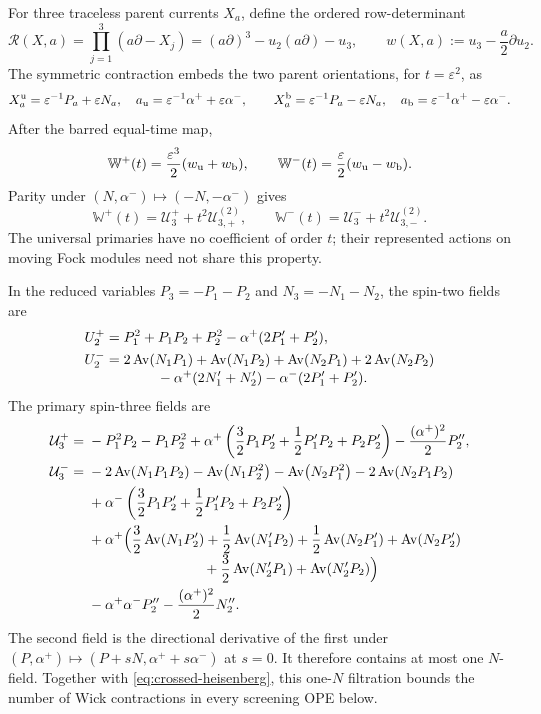 \documentclass[11pt,a4paper]{article}
\numberwithin{equation}{section}
\theoremstyle{remark}
\newcommand{\Av}[1]{\operatorname{Av}\!\left(#1\right)}
\newcommand{\cU}{\mathcal U}
\newcommand{\eps}{\varepsilon}
\begin{document}
For three traceless parent currents $X_a$, define the ordered row-determinant
\begin{equation}
 \mathcal R(X,a)=\prod_{j=1}^3(a\partial-X_j)
 =(a\partial)^3-u_2(a\partial)-u_3,
 \qquad
 w(X,a):=u_3-\frac a2\partial u_2.
 \label{eq:parent-miura}
\end{equation}
The symmetric contraction embeds the two parent orientations, for $t=\eps^2$, as
\begin{equation}
 X_a^{\rm u}=\eps^{-1}P_a+\eps N_a,\quad
 a_{\rm u}=\eps^{-1}\alpha^++\eps\alpha^-,
 \qquad
 X_a^{\rm b}=\eps^{-1}P_a-\eps N_a,\quad
 a_{\rm b}=\eps^{-1}\alpha^+-\eps\alpha^-.
 \label{eq:parent-embeddings}
\end{equation}
After the barred equal-time map,
\begin{equation}
 \mathbb W^+(t)=\frac{\eps^3}{2}(w_{\rm u}+w_{\rm b}),\qquad
 \mathbb W^-(t)=\frac{\eps}{2}(w_{\rm u}-w_{\rm b}).
 \label{eq:contracted-primary-families}
\end{equation}
Parity under $(N,\alpha^-)\mapsto(-N,-\alpha^-)$ gives
\begin{equation}
 \mathbb W^+(t)=\cU_3^++t^2\cU_{3,+}^{(2)},\qquad
 \mathbb W^-(t)=\cU_3^-+t^2\cU_{3,-}^{(2)}.
 \label{eq:no-universal-linear-term}
\end{equation}
The universal primaries have no coefficient of order $t$; their represented actions on moving
Fock modules need not share this property.

In the reduced variables $P_3=-P_1-P_2$ and $N_3=-N_1-N_2$, the spin-two fields are
\begin{align}
 U_2^+&=P_1^2+P_1P_2+P_2^2-\alpha^+(2P_1'+P_2'),
 \label{eq:U2plus}\\
 U_2^-&=2\Av{N_1P_1}+\Av{N_1P_2}+\Av{N_2P_1}+2\Av{N_2P_2}
 \nonumber\\[-1mm]
 &\hspace{13mm}-\alpha^+(2N_1'+N_2')-\alpha^-(2P_1'+P_2').
 \label{eq:U2minus}
\end{align}
The primary spin-three fields are
\begin{align}
 \cU_3^+={}&-P_1^2P_2-P_1P_2^2
 +\alpha^+\left(\frac32P_1P_2'+\frac12P_1'P_2+P_2P_2'\right)
 -\frac{(\alpha^+)^2}{2}P_2'',
 \label{eq:U3plus}\\
 \cU_3^-={}&-2\Av{N_1P_1P_2}-\Av{N_1P_2^2}-\Av{N_2P_1^2}
 -2\Av{N_2P_1P_2}
 \nonumber\\
 &+\alpha^-\left(\frac32P_1P_2'+\frac12P_1'P_2+P_2P_2'\right)
 \nonumber\\
 &+\alpha^+\Bigl(\frac32\Av{N_1P_2'}+\frac12\Av{N_1'P_2}
 +\frac12\Av{N_2P_1'}+\Av{N_2P_2'}
 \nonumber\\[-1mm]
 &\hspace{29mm}+\frac32\Av{N_2'P_1}+\Av{N_2'P_2}\Bigr)
 \nonumber\\
 &-\alpha^+\alpha^-P_2''-\frac{(\alpha^+)^2}{2}N_2''.
 \label{eq:U3minus}
\end{align}
The second field is the directional derivative of the first under
$(P,\alpha^+)\mapsto(P+sN,\alpha^++s\alpha^-)$ at $s=0$.  It therefore contains at most
one $N$-field.  Together with \cref{eq:crossed-heisenberg}, this one-$N$ filtration bounds the
number of Wick contractions in every screening OPE below.
\end{document}
